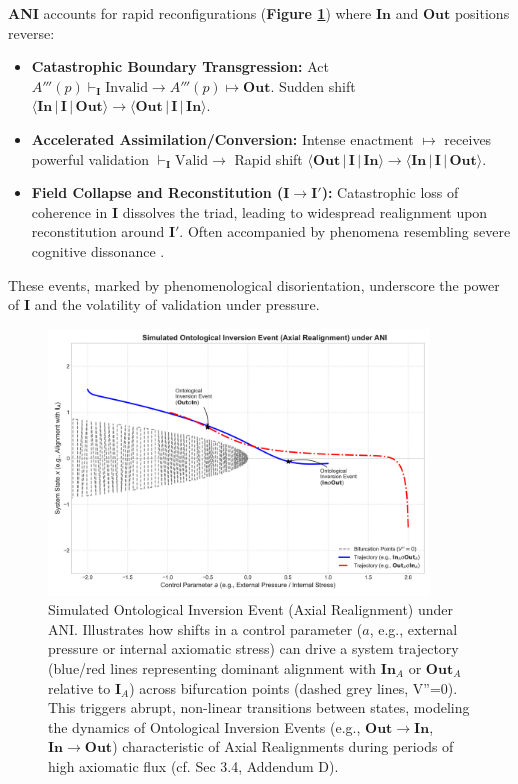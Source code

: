 \documentclass{article}
\newcommand{\ANI}{\textbf{ANI}}             %
\newcommand{\Isness}{\mathbf{I}}            %
\newcommand{\Inness}{\mathbf{In}}           %
\newcommand{\Outness}{\mathbf{Out}}         %
\newcommand{\enactment}{\ensuremath{\mapsto}} %
\newcommand{\validates}[1]{\ensuremath{\vdash_{#1}}} %
\newcommand{\orientation}[3]{\ensuremath{\langle #1 \,|\, #2 \,|\, #3 \rangle}} %
\begin{document}
\ANI{} accounts for rapid reconfigurations (\textbf{Figure \ref{fig:inversion}}) where $\Inness$ and $\Outness$ positions reverse:
\begin{itemize}
    \item \textbf{Catastrophic Boundary Transgression:} Act $A'''(p) \validates{\Isness} \text{Invalid} \rightarrow A'''(p) \enactment \Outness$. Sudden shift $\orientation{\Inness}{\Isness}{\Outness} \rightarrow \orientation{\Outness}{\Isness}{\Inness}$.
    \item \textbf{Accelerated Assimilation/Conversion:} Intense enactment $\enactment$ receives powerful validation $\validates{\Isness} \text{Valid} \rightarrow$ Rapid shift $\orientation{\Outness}{\Isness}{\Inness} \rightarrow \orientation{\Inness}{\Isness}{\Outness}$.
    \item \textbf{Field Collapse and Reconstitution ($\Isness \rightarrow \Isness'$):} Catastrophic loss of coherence in $\Isness$ dissolves the triad, leading to widespread realignment upon reconstitution around $\Isness'$. Often accompanied by phenomena resembling severe cognitive dissonance \citep{Festinger1956}.
\end{itemize}
These events, marked by phenomenological disorientation, underscore the power of $\Isness$ and the volatility of validation under pressure.

\begin{figure}[h!] %
    \centering
    \includegraphics[width=0.9\textwidth]{figures/ani_figure4_inversion_event.png}
    \caption{Simulated Ontological Inversion Event (Axial Realignment) under ANI. Illustrates how shifts in a control parameter (\(a\), e.g., external pressure or internal axiomatic stress) can drive a system trajectory (blue/red lines representing dominant alignment with $\Inness_A$ or $\Outness_A$ relative to $\Isness_A$) across bifurcation points (dashed grey lines, V''=0). This triggers abrupt, non-linear transitions between states, modeling the dynamics of Ontological Inversion Events (e.g., $\Outness \rightarrow \Inness$, $\Inness \rightarrow \Outness$) characteristic of Axial Realignments during periods of high axiomatic flux (cf. Sec 3.4, Addendum D).}
    \label{fig:inversion}
\end{figure}
\end{document}
